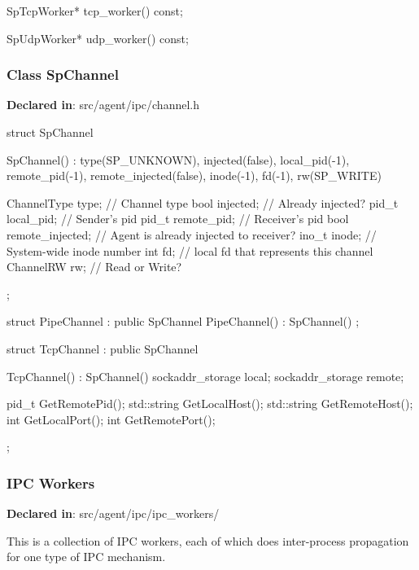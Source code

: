 \begin{apient}
SpTcpWorker* tcp_worker() const;
\end{apient}

\begin{apient}
SpUdpWorker* udp_worker() const;
\end{apient}

\subsubsection{Class SpChannel}
\textbf{Declared in}: src/agent/ipc/channel.h

\begin{apient}
struct SpChannel {
  SpChannel() :
  type(SP_UNKNOWN), injected(false), local_pid(-1), remote_pid(-1),
    remote_injected(false), inode(-1), fd(-1), rw(SP_WRITE) {}

  ChannelType type;      // Channel type
  bool injected;         // Already injected?
  pid_t local_pid;       // Sender's pid
  pid_t remote_pid;      // Receiver's pid
  bool remote_injected;  // Agent is already injected to receiver?
  ino_t inode;           // System-wide inode number
  int fd;                // local fd that represents this channel
  ChannelRW rw;          // Read or Write?
};

struct PipeChannel : public SpChannel {
  PipeChannel() : SpChannel() {}
};

struct TcpChannel : public SpChannel {
  TcpChannel() :
  SpChannel() {}
  sockaddr_storage local;
  sockaddr_storage remote;

  pid_t GetRemotePid();
  std::string GetLocalHost();
  std::string GetRemoteHost();
  int GetLocalPort();
  int GetRemotePort();
};
\end{apient}


\subsubsection{IPC Workers}
\textbf{Declared in}: src/agent/ipc/ipc\_workers/

This is a collection of IPC workers, each of which does inter-process
propagation for one type of IPC mechanism.

